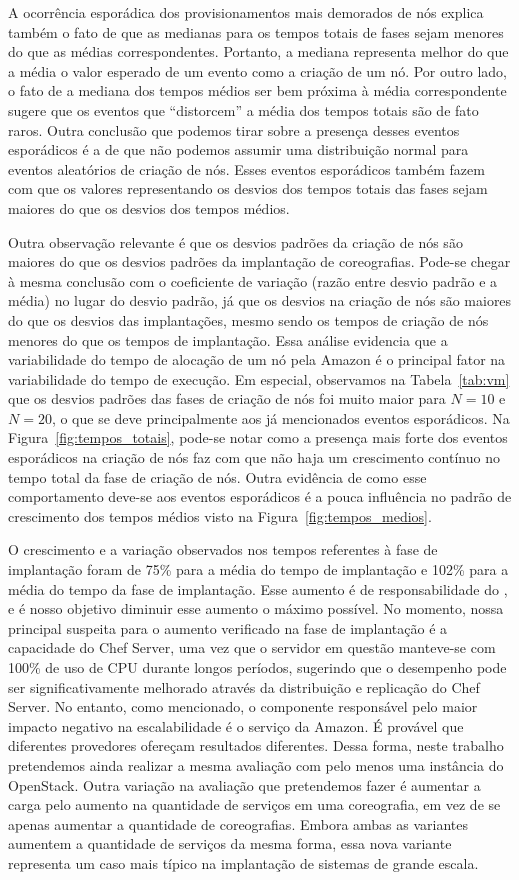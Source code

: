 A ocorrência esporádica dos provisionamentos mais demorados de nós explica também o fato de que as medianas para os tempos totais de fases sejam menores do que as médias correspondentes. Portanto, a mediana representa melhor do que a média o valor esperado de um evento como a criação de um nó. Por outro lado, o fato de a mediana dos tempos médios ser bem próxima à média correspondente sugere que os eventos que ``distorcem'' a média dos tempos totais são de fato raros. Outra conclusão que podemos tirar sobre a presença desses eventos esporádicos é a de que não podemos assumir uma distribuição normal para eventos aleatórios de criação de nós. Esses eventos esporádicos também fazem com que os valores representando os desvios dos tempos totais das fases sejam maiores do que os desvios dos tempos médios. 

Outra observação relevante é que os desvios padrões da criação de nós são maiores do que os desvios padrões da implantação de coreografias. Pode-se chegar à mesma conclusão com o coeficiente de variação (razão entre desvio padrão e a média) no lugar do desvio padrão, já que os desvios na criação de nós são maiores do que os desvios das implantações, mesmo sendo os tempos de criação de nós menores do que os tempos de implantação. Essa análise evidencia que a variabilidade do tempo de alocação de um nó pela Amazon é o principal fator na variabilidade do tempo de execução. Em especial, observamos na Tabela~\ref{tab:vm} que os desvios padrões das fases de criação de nós foi muito maior para $N=10$ e $N=20$, o que se deve principalmente aos já mencionados eventos esporádicos. Na Figura~\ref{fig:tempos_totais}, pode-se notar como a presença mais forte dos eventos esporádicos na criação de nós faz com que não haja um crescimento contínuo no tempo total da fase de criação de nós. Outra evidência de como esse comportamento deve-se aos eventos esporádicos é a pouca influência no padrão de crescimento dos tempos médios visto na Figura~\ref{fig:tempos_medios}.

O crescimento e a variação observados nos tempos referentes à fase de implantação foram de 75\% para a média do tempo de implantação e 102\%  para a média do tempo da fase de implantação. Esse aumento é de responsabilidade do \ee, e é nosso objetivo diminuir esse aumento o máximo possível. No momento, nossa principal suspeita para o aumento verificado na fase de implantação é a capacidade do Chef Server, uma vez que o servidor em questão manteve-se com 100\% de uso de CPU durante longos períodos, sugerindo que o desempenho pode ser significativamente melhorado através da distribuição e replicação do Chef Server. No entanto, como mencionado, o componente responsável pelo maior impacto negativo na escalabilidade é o serviço da Amazon. É provável que diferentes provedores ofereçam resultados diferentes. Dessa forma, neste trabalho pretendemos ainda realizar a mesma avaliação com pelo menos uma instância do OpenStack. Outra variação na avaliação que pretendemos fazer é aumentar a carga pelo aumento na quantidade de serviços em uma coreografia, em vez de se apenas aumentar a quantidade de coreografias. Embora ambas as variantes aumentem a quantidade de serviços da mesma forma, essa nova variante representa um caso mais típico na implantação de sistemas de grande escala.

